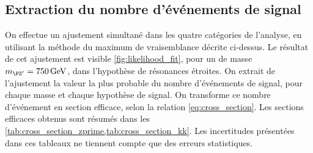 \subsection{Extraction du nombre d'événements de signal}

On effectue un ajustement simultané dans les quatre catégories de l'analyse, en utilisant la méthode du maximum de vraisemblance décrite ci-dessus. Le résultat de cet ajustement est visible \cref{fig:likelihood_fit}, pour un \zprime de masse $\mzp = \SI{750}{\GeV}$, dans l'hypothèse de résonances étroites. On extrait de l'ajustement la valeur la plus probable du nombre d'événements de signal, pour chaque masse et chaque hypothèse de signal. On transforme ce nombre d'événement en section efficace, selon la relation \ref{eq:cross_section}. Les sections efficaces obtenus sont résumés dans les \cref{tab:cross_section_zprime,tab:cross_section_kk}. Les incertitudes présentées dans ces tableaux ne tiennent compte que des erreurs statistiques.

